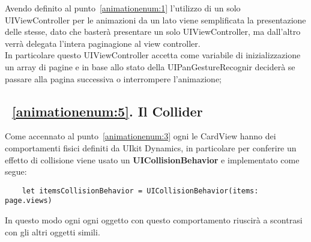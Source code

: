 Avendo definito al punto~\ref{animationenum:1} l'utilizzo di un solo UIViewController per le animazioni da un lato viene semplificata
la presentazione delle stesse, dato che basterà presentare un solo UIViewController, ma dall'altro verrà delegata
l'intera paginagione al view controller. \\

In particolare questo UIViewController accetta come variabile di inizializzazione
un array di pagine e in base allo stato della UIPanGestureRecognir deciderà se passare alla pagina successiva
o interrompere l'animazione;


\subsection{~\ref{animationenum:5}. Il Collider}

Come accennato al punto~\ref{animationenum:3} ogni le CardView hanno dei comportamenti fisici definiti
da UIkit Dynamics, in particolare per conferire un effetto di collisione viene usato un \textbf{UICollisionBehavior} e implementato come segue:

\begin{verbatim}
    let itemsCollisionBehavior = UICollisionBehavior(items: page.views)
\end{verbatim}

In questo modo ogni ogni oggetto con questo
comportamento riuscirà a scontrasi con gli altri oggetti simili.
